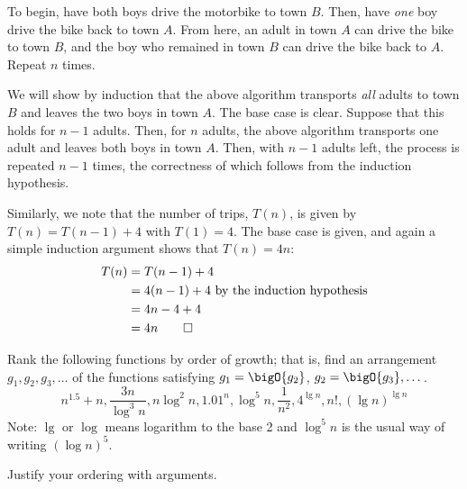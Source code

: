 \documentclass[draft]{article}
\begin{document}
\begin{solution}
    To begin, have both boys drive the motorbike to town $B$. Then, have \emph{one} boy drive the bike back to town $A$. From here, an adult in town $A$ can drive the bike to town $B$, and the boy who remained in town $B$ can drive the bike back to $A$. Repeat $n$ times.

    We will show by induction that the above algorithm transports \emph{all} adults to town $B$ and leaves the two boys in town $A$. The base case is clear. Suppose that this holds for $n - 1$ adults. Then, for $n$ adults, the above algorithm transports one adult and leaves both boys in town $A$. Then, with $n - 1$ adults left, the process is repeated $n - 1$ times, the correctness of which follows from the induction hypothesis.

    Similarly, we note that the number of trips, $T(n)$, is given by $T(n) = T(n - 1) + 4$ with $T(1) = 4$. The base case is given, and again a simple induction argument shows that $T(n) = 4n$:
    \begin{align*}T(n)
         & = T(n - 1) + 4                                     \\
         & = 4(n - 1) + 4 \hbox{ by the induction hypothesis} \\
         & = 4n - 4 + 4                                       \\
         & = 4n\qedhere
    \end{align*}
\end{solution}

\begin{exercise}{2.12}
    Rank the following functions by order of growth; that is, find an
    arrangement $g_1, g_2, g_3, \dots$ of the functions satisfying
    $g_1=\bigO{g_2}$, $g_2=\bigO{g_3}, \dots$.
    \[n^{1.5} + n, \frac{3n}{\log^3 n}, n \log^2 n, 1.01^n,   \log^{5} n,
        \frac{1}{n^2},  4^{\lg n}, n!,  (\lg n)^{\lg n}\]
    Note: $\lg$ or $\log$ means logarithm to the base 2 and $\log^{5} n$ is the usual way of writing
    $(\log n)^{5}$.

    Justify your ordering with arguments.
\end{exercise}
\end{document}

